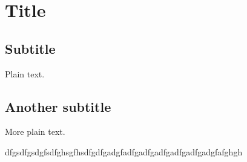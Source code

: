 \documentclass{article}
\begin{document}
\section{Title}

\subsection{Subtitle}

Plain text.

\subsection{Another subtitle}

More plain text.


dfgsdfgsdgfsdfghsgfhsdfgdfgadgfadfgadfgadfgadfgadfgadgfafghgh
\end{document}
